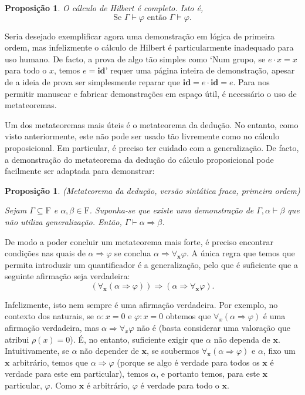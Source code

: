 \documentclass{report}
\newtheorem{prop}{Proposição}
\newtheorem*{prop*}{Proposição}
\theoremstyle{definition}
\theoremstyle{remark}
\renewcommand{\bf}[1]{\mathbf{#1}}
\newcommand{\F}{\mathrm{F}}
\newcommand{\imply}{\mathbin{\Rightarrow}}
\begin{document}
	\begin{prop}
	O cálculo de Hilbert é completo. Isto é,
	\[\text{Se } \Gamma \vdash \varphi \text{ então } \Gamma \vDash \varphi.\]
	\end{prop}
	
	Seria desejado exemplificar agora uma demonstração em lógica de primeira ordem, mas infelizmente o cálculo de Hilbert é particularmente inadequado para uso humano. De facto, a prova de algo tão simples como `Num grupo, se $e \cdot x = x$ para todo o $x$, temos $e = \textbf{id}$' requer uma página inteira de demonstração, apesar de a ideia de prova ser simplesmente reparar que $\textbf{id} = e \cdot \textbf{id} = e$. Para nos permitir manusear e fabricar demonstrações em espaço útil, é necessário o uso de metateoremas.
	
	Um dos metateoremas mais úteis é o metateorema da dedução. No entanto, como visto anteriormente, este não pode ser usado tão livremente como no cálculo proposicional. Em particular, é preciso ter cuidado com a generalização. De facto, a demonstração do metateorema da dedução do cálculo proposicional pode facilmente ser adaptada para demonstrar:
	
	\begin{prop*}
	(Metateorema da dedução, versão sintática fraca, primeira ordem)
	
	Sejam $\Gamma \subseteq \F$ e $\alpha, \beta \in \F$. Suponha-se que existe uma demonstração de $\Gamma, \alpha \vdash \beta$ que não utiliza generalização. Então, $\Gamma \vdash \alpha \imply \beta$.
	\end{prop*}
	
	De modo a poder concluir um metateorema mais forte, é preciso encontrar condições nas quais de $\alpha \imply \varphi$ se conclua $\alpha \imply \forall_{\bf x} \varphi$. A única regra que temos que permita introduzir um quantificador é a generalização, pelo que é suficiente que a seguinte afirmação seja verdadeira:
	\begin{equation}\label{folax4}
	(\forall_{\bf x} (\alpha \imply \varphi)) \imply (\alpha \imply \forall_{\bf x} \varphi).
	\end{equation}
	
	Infelizmente, isto nem sempre é uma afirmação verdadeira. Por exemplo, no contexto dos naturais, se $\alpha : x = 0$ e $\varphi : x = 0$ obtemos que $\forall_x (\alpha \imply \varphi)$ é uma afirmação verdadeira, mas $\alpha \imply \forall_x \varphi$ não é (basta considerar uma valoração que atribui $\rho(x) = 0$). É, no entanto, suficiente exigir que $\alpha$ não dependa de $\bf x$. Intuitivamente, se $\alpha$ não depender de $\bf x$, se soubermos $\forall_{\bf x} (\alpha \imply \varphi)$ e $\alpha$, fixo um $\bf x$ arbitrário, temos que $\alpha \imply \varphi$ (porque se algo é verdade para todos os $\bf x$ é verdade para este em particular), temos $\alpha$, e portanto temos, para este $\bf x$ particular, $\varphi$. Como $\bf x$ é arbitrário, $\varphi$ é verdade para todo o $\bf x$.
	
\end{document}
